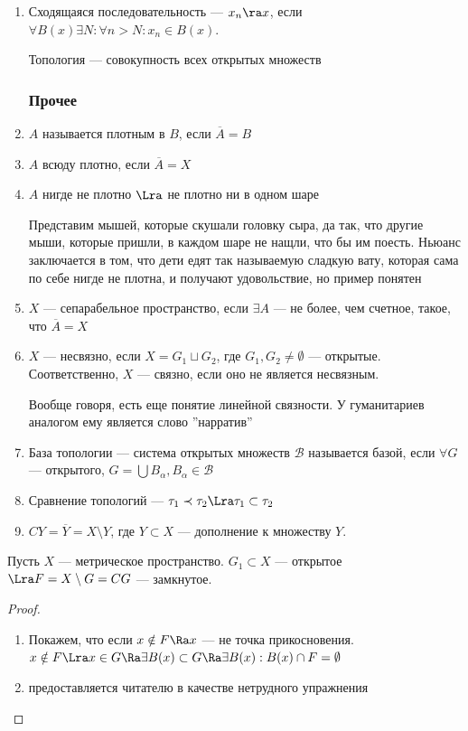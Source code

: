 \begin{enumerate}
    \item Сходящаяся последовательность --- \(x_n \ra x\), если \(\forall B(x) \exists N: \forall n > N: x_n \in B(x)\).
    
    Топология --- совокупность всех открытых множеств

\subsubsection{Прочее}
    \item \(A\) называется плотным в \(B\), если \(\overline{A} = B\)
    \item \(A\) всюду плотно, если \(\overline{A} = X\)
    \item \(A\) нигде не плотно \(\Lra\) не плотно ни в одном шаре
    
    Представим мышей, которые скушали головку сыра, да так, что другие мыши, которые пришли, в каждом шаре не нащли, что бы им поесть. Ньюанс заключается в том, что дети едят так называемую сладкую вату, которая сама по себе нигде не плотна, и получают удовольствие, но пример понятен

    \item \(X\) --- сепарабельное пространство, если \(\exists A\) --- не более, чем счетное, такое, что \(\overline{A} = X\)
    
    \item \(X\) --- несвязно, если \(X = G_1 \sqcup G_2\), где \(G_1, G_2 \ne \emptyset\) --- открытые. Соответственно, \(X\) --- связно, если оно не является несвязным.
    
    Вообще говоря, есть еще понятие линейной связности. У гуманитариев аналогом ему является слово ''нарратив''

    \item База топологии --- система открытых множеств \(\mathcal{B}\) называется базой, если \(\forall G\) --- открытого, \(G = \bigcup B_\alpha, B_\alpha \in \mathcal{B}\)
    \item Сравнение топологий --- \(\tau_1 \prec \tau_2 \Lra \tau_1 \subset \tau_2\)
    \item \(CY = \overline{Y} = X \setminus Y\), где \(Y \subset X\) --- дополнение к множеству \(Y\).
\end{enumerate}

\begin{theorem}
    Пусть \(X\) --- метрическое пространство. \(G_1 \subset X\) --- открытое \(\Lra F = X \setminus G = CG\) --- замкнутое.
\end{theorem}
\begin{proof}
    \begin{enumerate}
        \item[\(\Ra\)] Покажем, что если \(x \notin F \Ra x\) --- не точка прикосновения. \(x \notin F \Lra x \in G \Ra \exists B(x) \subset G \Ra \exists B(x): B(x) \cap F = \emptyset\)
        \item[\(\La\)] предоставляется читателю в качестве нетрудного упражнения
    \end{enumerate}
\end{proof}

